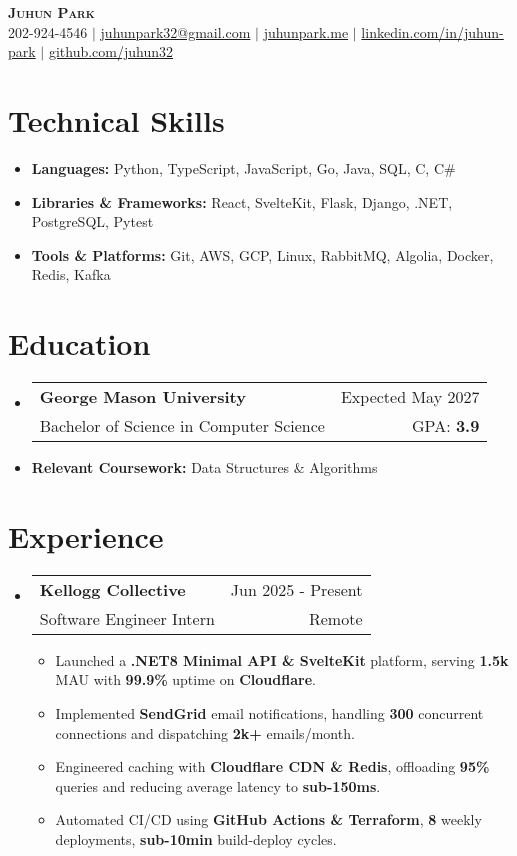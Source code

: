 \documentclass[letterpaper,11pt]{article}
\makeatletter
\newcommand{\resumeItem}[1]{
  \item{
    {#1}
  }
}
\newcommand{\resumeItemThin}[1]{
  \item{
    {#1 \vspace{-5pt}}
  }
}
\newcommand{\resumeSubheading}[4]{
    \item
    \begin{tabular*}{0.985\textwidth}[t]{l@{\extracolsep{\fill}}r@{\hspace{-0.1in}}}
        {\textbf{#1}} & {#2} \\
        #3 &  #4 \\
    \end{tabular*}\vspace{-5pt}
}
\newcommand{\resumeSubHeadingListStart}{\begin{itemize}[leftmargin=0.00in, rightmargin=-0.2in, label={}]\vspace{3pt}}
\newcommand{\resumeSubHeadingListEnd}{\end{itemize}\vspace{-5pt}}
\newcommand{\resumeItemListStart}{\vspace{3pt}\begin{itemize}[leftmargin=0.15in, rightmargin=0.15in]}
\newcommand{\resumeItemListEnd}{\end{itemize}\vspace{-5pt}}
\makeatother
\begin{document}

\begin{center}
  \textbf{\Huge \scshape {Juhun Park}} \\ \vspace{3pt}
   202-924-4546 $|$
  \href{mailto:juhunpark32@gmail.com}{juhunpark32@gmail.com} $|$
  \href{https://www.juhunpark.me/}{juhunpark.me} $|$
  \href{https://linkedin.com/in/juhun-park}{linkedin.com/in/juhun-park} $|$
  \href{https://github.com/juhun32}{github.com/juhun32} \\
\end{center}

\vspace{-10pt}


\section{Technical Skills}
\resumeItemListStart
\resumeItemThin{\textbf{Languages: }{Python, TypeScript, JavaScript, Go, Java, SQL, C, C\#}}\\
\resumeItemThin{\textbf{Libraries \& Frameworks: }{React, SvelteKit, Flask, Django, .NET, PostgreSQL, Pytest}}\\
\resumeItemThin{\textbf{Tools \& Platforms: }{Git, AWS, GCP, Linux, RabbitMQ, Algolia, Docker, Redis, Kafka}}\\
\resumeItemListEnd


\section{Education}
\resumeSubHeadingListStart
\resumeSubheading
{George Mason University}{Expected May 2027}
{Bachelor of Science in Computer Science}{GPA: \textbf{3.9}}
\resumeItem{\textbf{Relevant Coursework: }{Data Structures \& Algorithms}}
\vspace{-5pt}
\resumeSubHeadingListEnd


\section{Experience}

\resumeSubHeadingListStart
\resumeSubheading
{Kellogg Collective} {Jun 2025 - Present}
{Software Engineer Intern} {Remote}
\resumeItemListStart
\resumeItem{Launched a \textbf{.NET8 Minimal API \& SvelteKit} platform, serving \textbf{1.5k} MAU with \textbf{99.9\%} uptime on \textbf{Cloudflare}.}
\resumeItem{Implemented \textbf{SendGrid} email notifications, handling \textbf{300} concurrent connections and dispatching \textbf{2k+} emails/month.}
\resumeItem{Engineered caching with \textbf{Cloudflare CDN \& Redis}, offloading \textbf{95\%} queries and reducing average latency to \textbf{sub-150ms}.}
\resumeItem{Automated CI/CD using \textbf{GitHub Actions \& Terraform}, \textbf{8} weekly deployments, \textbf{sub-10min} build-deploy cycles.}
\resumeItemListEnd
\resumeSubHeadingListEnd
\end{document}
